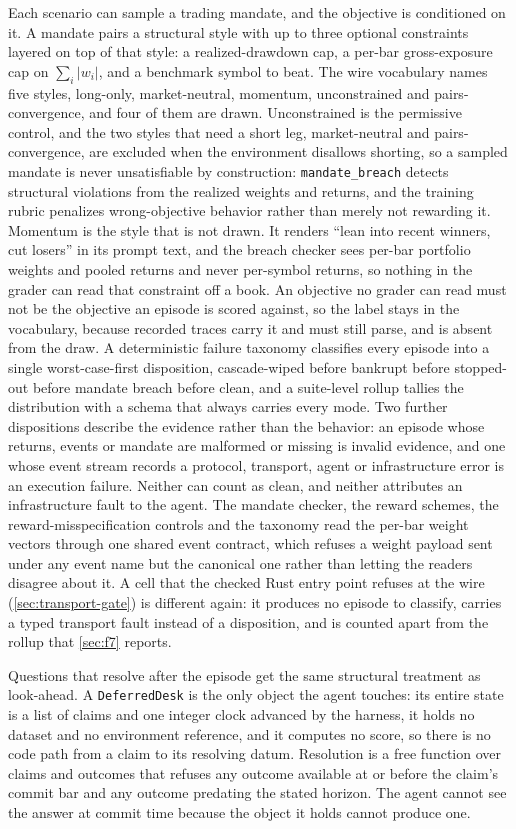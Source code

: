 Each scenario can sample a trading mandate, and the objective is conditioned on it. A mandate pairs a structural style with up to three optional constraints layered on top of that style: a realized-drawdown cap, a per-bar gross-exposure cap on $\sum_i |w_i|$, and a benchmark symbol to beat. The wire vocabulary names five styles, long-only, market-neutral, momentum, unconstrained and pairs-convergence, and four of them are drawn. Unconstrained is the permissive control, and the two styles that need a short leg, market-neutral and pairs-convergence, are excluded when the environment disallows shorting, so a sampled mandate is never unsatisfiable by construction: \texttt{mandate\_breach} detects structural violations from the realized weights and returns, and the training rubric penalizes wrong-objective behavior rather than merely not rewarding it. Momentum is the style that is not drawn. It renders ``lean into recent winners, cut losers'' in its prompt text, and the breach checker sees per-bar portfolio weights and pooled returns and never per-symbol returns, so nothing in the grader can read that constraint off a book. An objective no grader can read must not be the objective an episode is scored against, so the label stays in the vocabulary, because recorded traces carry it and must still parse, and is absent from the draw. A deterministic failure taxonomy classifies every episode into a single worst-case-first disposition, cascade-wiped before bankrupt before stopped-out before mandate breach before clean, and a suite-level rollup tallies the distribution with a schema that always carries every mode. Two further dispositions describe the evidence rather than the behavior: an episode whose returns, events or mandate are malformed or missing is invalid evidence, and one whose event stream records a protocol, transport, agent or infrastructure error is an execution failure. Neither can count as clean, and neither attributes an infrastructure fault to the agent. The mandate checker, the reward schemes, the reward-misspecification controls and the taxonomy read the per-bar weight vectors through one shared event contract, which refuses a weight payload sent under any event name but the canonical one rather than letting the readers disagree about it. A cell that the checked Rust entry point refuses at the wire (\cref{sec:transport-gate}) is different again: it produces no episode to classify, carries a typed transport fault instead of a disposition, and is counted apart from the rollup that \cref{sec:f7} reports.

Questions that resolve after the episode get the same structural treatment as look-ahead. A \texttt{DeferredDesk} is the only object the agent touches: its entire state is a list of claims and one integer clock advanced by the harness, it holds no dataset and no environment reference, and it computes no score, so there is no code path from a claim to its resolving datum. Resolution is a free function over claims and outcomes that refuses any outcome available at or before the claim's commit bar and any outcome predating the stated horizon. The agent cannot see the answer at commit time because the object it holds cannot produce one.

